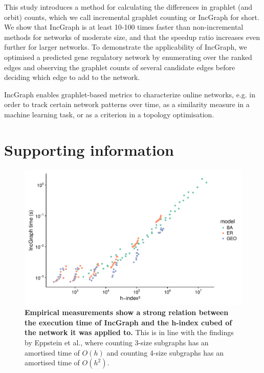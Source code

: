 This study introduces a method for calculating the differences in graphlet (and orbit) counts, which we call incremental graphlet counting or IncGraph for short. We show that IncGraph is at least 10-100 times faster than non-incremental methods for networks of moderate size, and that the speedup ratio increases even further for larger networks. 
To demonstrate the applicability of IncGraph, we optimised a predicted gene regulatory network by enumerating over the ranked edges and observing the graphlet counts of several candidate edges before deciding which edge to add to the network.

IncGraph enables graphlet-based metrics to characterize online networks, e.g. in order to track certain network patterns over time, as a similarity measure in a machine learning task, or as a criterion in a topology optimisation.


\section{Supporting information}

\newcommand{\pluseq}{\mathrel{+}=}
\newcommand{\asteq}{\mathrel{*}=}

\begin{figure}[htb!]
	\centering
	\includegraphics[width=.8\linewidth]{fig/figureS1.pdf} 
	\caption{
		\textbf{Empirical measurements show a strong relation between the execution time of IncGraph and the h-index cubed of the network it was applied to.} This is in line with the findings by Eppstein et al., where counting 3-size subgraphs has an amortised time of $O(h)$ and counting 4-size subgraphs has an amortised time of $O(h^2)$.
	}
	\label{sfig_hindex}
\end{figure}

